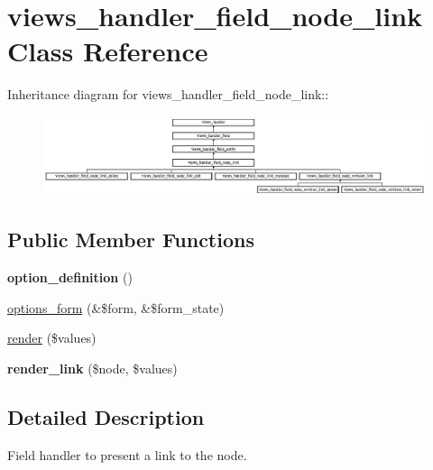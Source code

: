 \hypertarget{classviews__handler__field__node__link}{
\section{views\_\-handler\_\-field\_\-node\_\-link Class Reference}
\label{classviews__handler__field__node__link}
}
Inheritance diagram for views\_\-handler\_\-field\_\-node\_\-link::\begin{figure}[H]
\begin{center}
\leavevmode
\includegraphics[height=2.34146cm]{classviews__handler__field__node__link}
\end{center}
\end{figure}
\subsection*{Public Member Functions}
\begin{DoxyCompactItemize}
\item 
\hypertarget{classviews__handler__field__node__link_a68b2956fb07cb821f9f9ece53ddf7a20}{
{\bfseries option\_\-definition} ()}
\label{classviews__handler__field__node__link_a68b2956fb07cb821f9f9ece53ddf7a20}

\item 
\hyperlink{classviews__handler__field__node__link_afe6559cbf0b01700ae56fa62c5ca7616}{options\_\-form} (\&\$form, \&\$form\_\-state)
\item 
\hyperlink{classviews__handler__field__node__link_a9621ff38a6b318eb94f0c44fa2f711f5}{render} (\$values)
\item 
\hypertarget{classviews__handler__field__node__link_ae62c8a1473e0874c3eb81e579f49abfa}{
{\bfseries render\_\-link} (\$node, \$values)}
\label{classviews__handler__field__node__link_ae62c8a1473e0874c3eb81e579f49abfa}

\end{DoxyCompactItemize}


\subsection{Detailed Description}
Field handler to present a link to the node. 

